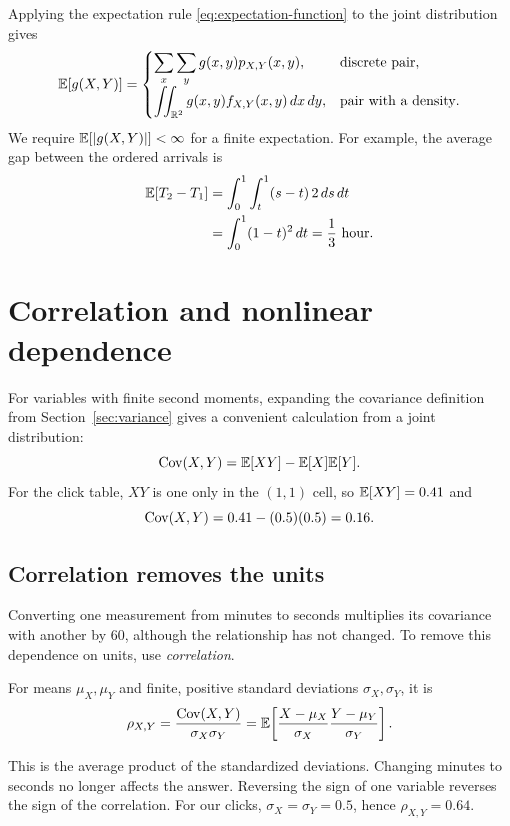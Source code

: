 Applying the expectation rule \eqref{eq:expectation-function} to the
joint distribution gives
\begin{equation}
  \mathbb{E}[g(X,Y)]=
  \begin{cases}
    \displaystyle\sum_x\sum_y g(x,y)p_{X,Y}(x,y),
      &\text{discrete pair},\\[6pt]
    \displaystyle\iint_{\mathbb{R}^2}g(x,y)f_{X,Y}(x,y)\,dx\,dy,
      &\text{pair with a density}.
  \end{cases}
  \label{eq:joint-function-expectation}
\end{equation}
We require \(\mathbb{E}[|g(X,Y)|]<\infty\) for a finite expectation.
For example, the average gap between the ordered arrivals is
\begin{align*}
  \mathbb{E}[T_2-T_1]
    &=\int_0^1\int_t^1(s-t)\,2\,ds\,dt\\
    &=\int_0^1(1-t)^2\,dt=\frac13\text{ hour}.
\end{align*}

\section{Correlation and nonlinear dependence}
\label{sec:covariance-correlation}

For variables with finite second moments, expanding the covariance
definition from Section~\ref{sec:variance} gives a convenient calculation
from a joint distribution:
\begin{equation}
  \operatorname{Cov}(X,Y)=\mathbb{E}[XY]-\mathbb{E}[X]\mathbb{E}[Y].
  \label{eq:covariance-product}
\end{equation}
For the click table, \(XY\) is one only in the \((1,1)\) cell, so
\(\mathbb{E}[XY]=0.41\) and
\[
  \operatorname{Cov}(X,Y)=0.41-(0.5)(0.5)=0.16.
\]

\subsection{Correlation removes the units}

Converting one measurement from minutes to seconds multiplies its
covariance with another by \(60\), although the relationship has not
changed. To remove this dependence on units, use \emph{correlation}.
\begin{definition}[Correlation]
For means \(\mu_X,\mu_Y\) and finite, positive standard deviations
\(\sigma_X,\sigma_Y\), it is
\begin{equation}
  \rho_{X,Y}=\frac{\operatorname{Cov}(X,Y)}{\sigma_X\sigma_Y}
  =\mathbb{E}\!\left[
      \frac{X-\mu_X}{\sigma_X}\frac{Y-\mu_Y}{\sigma_Y}
    \right].
  \label{eq:correlation}
\end{equation}
\end{definition}
This is the average product of the standardized deviations. Changing
minutes to seconds no longer affects the answer. Reversing the sign of
one variable reverses the sign of the correlation. For our clicks,
\(\sigma_X=\sigma_Y=0.5\), hence \(\rho_{X,Y}=0.64\).

